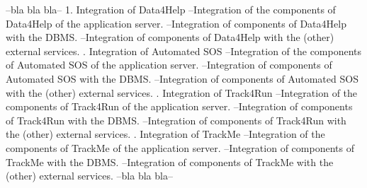 --bla bla bla--
1. Integration of Data4Help \newline
--Integration of the components of Data4Help of the application server.\newline
--Integration of components of Data4Help with the DBMS. \newline 
--Integration of components of Data4Help with the (other) external services. \newline  {}. Integration of Automated SOS \newline
--Integration of the components of Automated SOS of the application server.\newline
--Integration of components of Automated SOS with the DBMS. \newline 
--Integration of components of Automated SOS with the (other) external services. \newline {}. Integration of Track4Run \newline
--Integration of the components of Track4Run of the application server.\newline
--Integration of components of Track4Run with the DBMS. \newline 
--Integration of components of Track4Run with the (other) external services. \newline {}. Integration of TrackMe\newline
--Integration of the components of TrackMe of the application server.\newline
--Integration of components of TrackMe with the DBMS. \newline 
--Integration of components of TrackMe with the (other) external services. \newline 
--bla bla bla--